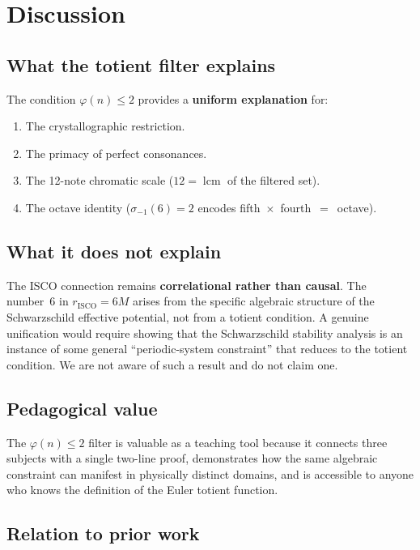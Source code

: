 \documentclass[preprint]{revtex4-2}
\DeclareMathOperator{\lcm}{lcm}
\begin{document}
\section{Discussion}\label{sec:discussion}

\subsection{What the totient filter explains}

The condition $\varphi(n) \leq 2$ provides a \textbf{uniform explanation} for:
\begin{enumerate}
\item The crystallographic restriction.
\item The primacy of perfect consonances.
\item The 12-note chromatic scale ($12 = \lcm$ of the filtered set).
\item The octave identity ($\sigma_{-1}(6) = 2$ encodes fifth~$\times$~fourth~$=$~octave).
\end{enumerate}

\subsection{What it does not explain}

The ISCO connection remains \textbf{correlational rather than causal}. The number~6 in $r_{\text{ISCO}} = 6M$ arises from the specific algebraic structure of the Schwarzschild effective potential, not from a totient condition. A genuine unification would require showing that the Schwarzschild stability analysis is an instance of some general ``periodic-system constraint'' that reduces to the totient condition. We are not aware of such a result and do not claim one.

\subsection{Pedagogical value}

The $\varphi(n) \leq 2$ filter is valuable as a teaching tool because it connects three subjects with a single two-line proof, demonstrates how the same algebraic constraint can manifest in physically distinct domains, and is accessible to anyone who knows the definition of the Euler totient function.

\subsection{Relation to prior work}
\end{document}
